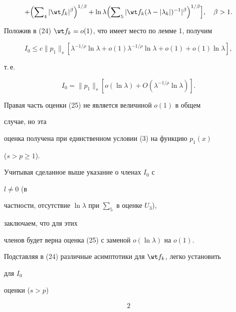 {\begin{multline}
+ \Bigl(\sumn_4|\wt f_k|^\beta\Bigr)^{1/\beta}+\ln\lambda


\Bigl(\sumn_5|\wt f_k(\lambda-|\lambda_k|)^{-1}|^\beta


\Bigr)^{1/\beta}\Bigr],\quad \beta>1.


\end{multline}





Положив в (24) $\wt f_k=o(1)$, что имеет место по лемме 1, получим


$$


I_0\le c\|p_1\|_s[\lambda^{-1/\rho}\ln\lambda+o(1)


\lambda^{-1/\rho}\ln\lambda+o(1)


+o(1)\ln\lambda],


$$


т.\,е.


\begin{equation}


I_0=\|p_1\|_s[o(\ln\lambda)+O(\lambda^{-1/\rho}\ln\lambda)].


\end{equation}


Правая часть оценки (25) не является величиной $o(1)$ в общем


случае, но эта


оценка получена при единственном условии (3) на функцию $p_1(x)$


($s>p\ge 1$).





\begin{note} Учитывая сделанное выше указание о членах $I_0$ с


$l\ne 0$ (в


частности, отсутствие $\ln\lambda$ при $\sum_5$ в оценке $U_3$),


заключаем, что для этих


членов будет верна оценка (25) с заменой $o(\ln\lambda)$ на $o(1)$.


\end{note}





Подставляя в (24) различные асимптотики для $\wt f_k$, легко установить


для $I_0$


оценки ($s>p$)


\begin{alignat}{2}



\end{alignat}}
